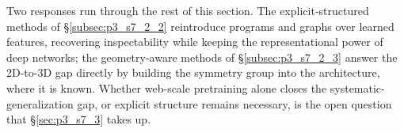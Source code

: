 Two responses run through the rest of this section.
The explicit-structured methods of §\ref{subsec:p3_s7_2_2} reintroduce programs and graphs over learned features, recovering inspectability while keeping the representational power of deep networks; the geometry-aware methods of §\ref{subsec:p3_s7_2_3} answer the 2D-to-3D gap directly by building the symmetry group into the architecture, where it is known.
Whether web-scale pretraining alone closes the systematic-generalization gap, or explicit structure remains necessary, is the open question that §\ref{sec:p3_s7_3} takes up.




